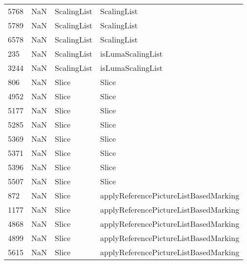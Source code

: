 \begin{tabular}{llll}
5768 &                   NaN &                ScalingList &                               ScalingList \\
5789 &                   NaN &                ScalingList &                               ScalingList \\
6578 &                   NaN &                ScalingList &                               ScalingList \\
235  &                   NaN &                ScalingList &                         isLumaScalingList \\
3244 &                   NaN &                ScalingList &                         isLumaScalingList \\
806  &                   NaN &                      Slice &                                     Slice \\
4952 &                   NaN &                      Slice &                                     Slice \\
5177 &                   NaN &                      Slice &                                     Slice \\
5285 &                   NaN &                      Slice &                                     Slice \\
5369 &                   NaN &                      Slice &                                     Slice \\
5371 &                   NaN &                      Slice &                                     Slice \\
5396 &                   NaN &                      Slice &                                     Slice \\
5507 &                   NaN &                      Slice &                                     Slice \\
872  &                   NaN &                      Slice &     applyReferencePictureListBasedMarking \\
1177 &                   NaN &                      Slice &     applyReferencePictureListBasedMarking \\
4868 &                   NaN &                      Slice &     applyReferencePictureListBasedMarking \\
4899 &                   NaN &                      Slice &     applyReferencePictureListBasedMarking \\
5615 &                   NaN &                      Slice &     applyReferencePictureListBasedMarking \\

\end{tabular}
